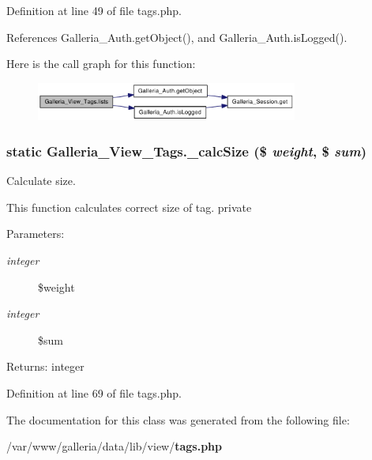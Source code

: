 Definition at line 49 of file tags.php.

References Galleria\_\-Auth.getObject(), and Galleria\_\-Auth.isLogged().

Here is the call graph for this function:\nopagebreak
\begin{figure}[H]
\begin{center}
\leavevmode
\includegraphics[width=244pt]{classGalleria__View__Tags_0add0141b5ada33c802aa6264eb218b3_cgraph}
\end{center}
\end{figure}
\subsubsection{\setlength{\rightskip}{0pt plus 5cm}static Galleria\_\-View\_\-Tags.\_\-calcSize (\$ {\em weight}, \$ {\em sum})\hspace{0.3cm}{\tt  [static, private]}}\label{classGalleria__View__Tags_00875391114850abe447ab2fed84f2c2}


Calculate size.

This function calculates correct size of tag.  private \begin{Desc}
\item[Parameters:]
\begin{description}
\item[{\em integer}]\$weight \item[{\em integer}]\$sum \end{description}
\end{Desc}
\begin{Desc}
\item[Returns:]integer \end{Desc}


Definition at line 69 of file tags.php.

The documentation for this class was generated from the following file:\begin{CompactItemize}
\item 
/var/www/galleria/data/lib/view/{\bf tags.php}\end{CompactItemize}
